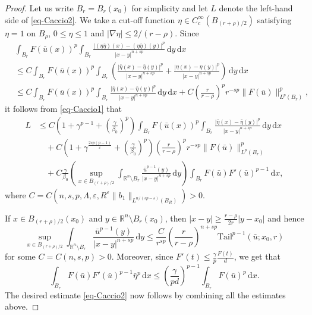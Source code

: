\documentclass[11pt]{amsart}
\theoremstyle{plain}
\theoremstyle{definition}
\numberwithin{equation}{section}
\begin{document}
\begin{proof}
Let us write $B_r = B_r(x_0)$ for simplicity and let $L$ denote the left-hand side of \eqref{eq-Caccio2}. We take a cut-off function $\eta \in C_c^{\infty}(B_{(r+\rho)/2})$ satisfying $\eta = 1$ on $B_\rho$, $0 \leq \eta \leq 1$ and $|\nabla \eta| \leq 2/(r-\rho)$. Since
\begin{equation*}
\begin{split}
&\int_{B_r} F(\bar{u}(x))^p \int_{B_r} \frac{|(\eta\bar{\eta})(x)-(\eta\bar{\eta})(y)|^p}{|x-y|^{n+sp}} \,\mathrm{d}y\,\mathrm{d}x \\
&\leq C \int_{B_r} F(\bar{u}(x))^p \int_{B_r} \left( \frac{|\bar{\eta}(x)-\bar{\eta}(y)|^p}{|x-y|^{n+sp}} + \frac{|\eta(x)-\eta(y)|^p}{|x-y|^{n+sp}} \right) \,\mathrm{d}y\,\mathrm{d}x \\
&\leq C \int_{B_r} F(\bar{u}(x))^p \int_{B_r} \frac{|\bar{\eta}(x)-\bar{\eta}(y)|^p}{|x-y|^{n+sp}} \,\mathrm{d}y\,\mathrm{d}x + C \left( \frac{r}{r-\rho} \right)^p r^{-sp} \|F(\bar{u})\|_{L^p(B_r)}^p,
\end{split}
\end{equation*}
it follows from \eqref{eq-Caccio1} that
\begin{equation*}
\begin{split}
L
&\leq C\left( 1+\gamma^{p-1}+\left( \frac{\gamma}{\beta_0} \right)^p \right) \int_{B_r} F(\bar{u}(x))^p \int_{B_r} \frac{|\bar{\eta}(x)-\bar{\eta}(y)|^p}{|x-y|^{n+sp}} \,\mathrm{d}y\,\mathrm{d}x \\
&\quad + C\left( 1+\gamma^{\frac{2sp(p-1)}{\varepsilon}}+\left( \frac{\gamma}{\beta_0} \right)^p \right) \left( \frac{r}{r-\rho} \right)^p r^{-sp} \|F(\bar{u})\|_{L^p(B_r)}^p \\
&\quad + C \frac{\gamma}{\beta_0} \left( \sup_{x \in B_{(r+\rho)/2}} \int_{\mathbb{R}^n \setminus B_r} \frac{\bar{u}^{p-1}(y)}{|x-y|^{n+sp}} \,\mathrm{d}y \right) \int_{B_r} F(\bar{u}) F'(\bar{u})^{p-1} \,\mathrm{d}x,
\end{split}
\end{equation*}
where $C=C(n, s, p, \Lambda, \varepsilon, R^{\varepsilon}\|b_1\|_{L^{n/(sp-\varepsilon)}(B_R)})>0$.

If $x \in B_{(r+\rho)/2}(x_0)$ and $y \in \mathbb{R}^n \setminus B_r(x_0)$, then $|x-y| \geq \frac{r-\rho}{2r}|y-x_0|$ and hence
\begin{equation*}
\sup_{x \in B_{(r+\rho)/2}} \int_{\mathbb{R}^n \setminus B_r} \frac{\bar{u}^{p-1}(y)}{|x-y|^{n+sp}} \,\mathrm{d}y \leq \frac{C}{r^{sp}} \left( \frac{r}{r-\rho} \right)^{n+sp} \mathrm{Tail}^{p-1}(\bar{u}; x_0, r)
\end{equation*}
for some $C=C(n, s, p)>0$. Moreover, since $F'(t) \leq \frac{\gamma}{p}\frac{F(t)}{d}$, we get that
\begin{equation*}
\int_{B_r} F(\bar{u}) F'(\bar{u})^{p-1} \bar{\eta}^p \,\mathrm{d}x \leq \left( \frac{\gamma}{pd} \right)^{p-1} \int_{B_r} F(\bar{u})^p \,\mathrm{d}x.
\end{equation*}
The desired estimate \eqref{eq-Caccio2} now follows by combining all the estimates above.
\end{proof}
\end{document}
